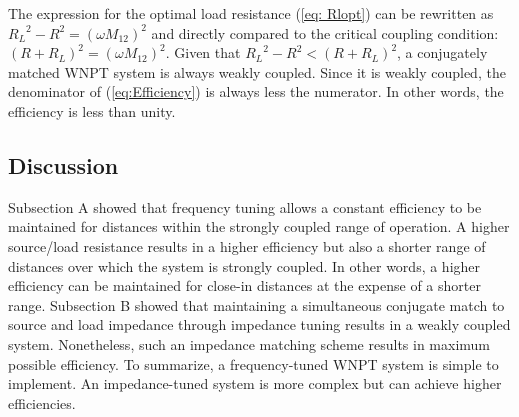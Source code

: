 \documentclass[journal]{IEEEtran}
\begin{document}
The expression for the optimal load resistance (\ref{eq: Rlopt}) can be rewritten as ${R_L}^2-R^2=\left(\omega M_{12}\right)^2$ and directly compared to the critical coupling condition: $\left(R+R_L\right)^2=\left(\omega M_{12}\right)^2$. Given that ${R_L}^2-R^2 < \left(R+R_L\right)^2$, a conjugately matched WNPT system is always weakly coupled. Since it is weakly coupled, the denominator of (\ref{eq:Efficiency}) is always less the numerator. In other words, the efficiency is less than unity.

\subsection{Discussion}
Subsection A showed that frequency tuning allows a constant efficiency to be maintained for distances within the strongly coupled range of operation. A higher source/load resistance results in a higher efficiency but also a shorter range of distances over which the system is strongly coupled. In other words, a higher efficiency can be maintained for close-in distances at the expense of a shorter range. Subsection B showed that maintaining a simultaneous conjugate match to source and load impedance through impedance tuning results in a weakly coupled system. Nonetheless, such an impedance matching scheme results in maximum possible efficiency. To summarize, a frequency-tuned WNPT system is simple to implement. An impedance-tuned system is more complex but can achieve higher efficiencies.
\end{document}
